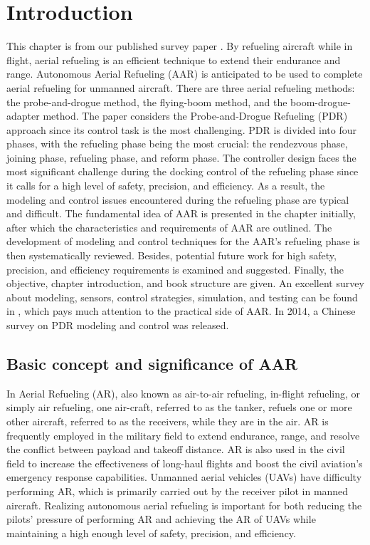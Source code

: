 \chapter{Introduction}
\label{chap1}
This chapter is from our published survey paper \cite{jinrui2024progress}.
By refueling aircraft while in flight, aerial refueling is an efficient technique to extend their endurance and range. Autonomous Aerial Refueling (AAR) is anticipated to be used to complete aerial refueling for unmanned aircraft. There are three aerial refueling methods: the probe-and-drogue method, the flying-boom method, and the boom-drogue-adapter method. The paper considers the Probe-and-Drogue Refueling (PDR) approach since its control task is the most challenging. PDR is divided into four phases, with the refueling phase being the most crucial: the rendezvous phase, joining phase, refueling phase, and reform phase. The controller design faces the most significant challenge during the docking control of the refueling phase since it calls for a high level of safety, precision, and efficiency. As a result, the modeling and control issues encountered during the refueling phase are typical and difficult. The fundamental idea of AAR is presented in the chapter initially, after which the characteristics and requirements of AAR are outlined. The development of modeling and control techniques for the AAR's refueling phase is then systematically reviewed. Besides, potential future work for high safety, precision, and efficiency requirements is examined and suggested. Finally, the objective, chapter introduction, and book structure are given. An excellent survey about modeling, sensors, control strategies, simulation, and testing can be found in \cite{AAR-2014}, which pays much attention to the practical side of AAR. In 2014, a Chinese survey \cite{quan2014survey} on PDR modeling and control was released. 

\section{Basic concept and significance of AAR}

In Aerial Refueling (AR), also known as air-to-air refueling, in-flight
refueling, or simply air refueling, one air-craft, referred to as
the tanker, refuels one or more other aircraft, referred to as the
receivers, while they are in the air. AR is frequently employed in
the military field to extend endurance, range, and resolve the conflict
between payload and takeoff distance. AR is also used in the civil
field to increase the effectiveness of long-haul flights and boost
the civil aviation's emergency response capabilities. Unmanned aerial
vehicles (UAVs) have difficulty performing AR, which is primarily
carried out by the receiver pilot in manned aircraft. Realizing autonomous
aerial refueling is important for both reducing the pilots' pressure
of performing AR and achieving the AR of UAVs while maintaining a
high enough level of safety, precision, and efficiency. 

